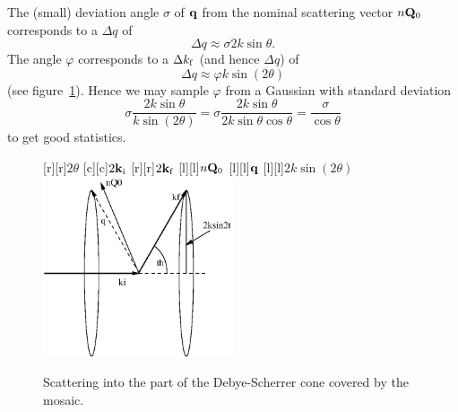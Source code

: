 The (small) deviation angle $\sigma$ of ${\bf q}$ from the nominal
scattering vector $n{\bf Q}_0$ corresponds to a $\Delta q$ of
\begin{equation} 
\Delta q \approx \sigma 2k\sin\theta. 
\end{equation}
The angle $\varphi$ corresponds to a $\Delta k_{\rm f}$ (and hence
$\Delta q$) of
\begin{equation}
\Delta q \approx \varphi k \sin(2\theta)
\end{equation}
(see figure~\ref{f:mosaic_cone}).
Hence we may sample $\varphi$ from a Gaussian with standard deviation
\begin{equation} 
\sigma\frac{2k\sin\theta}{k\sin(2\theta)} =
\sigma\frac{2k\sin\theta}{2k\sin\theta\cos\theta} =
\frac{\sigma}{\cos\theta}
\end{equation}
to get good statistics.
%
\begin{figure}
  \begin{center}
    [r][r]{$2\theta$}
    [c][c]{$2{\bf k}_{\rm i}$}
    [r][r]{$2{\bf k}_{\rm f}$}
    [l][l]{$n{\bf Q}_0$}
    [l][l]{$\bf q$}
    [l][l]{$2 k \sin(2 \theta)$}
    \includegraphics[width=0.5\textwidth]{figures/mosaic_cone.eps}
  \end{center}
\caption{Scattering into the part of the Debye-Scherrer cone covered by
    the mosaic.}
\label{f:mosaic_cone}
\end{figure}


